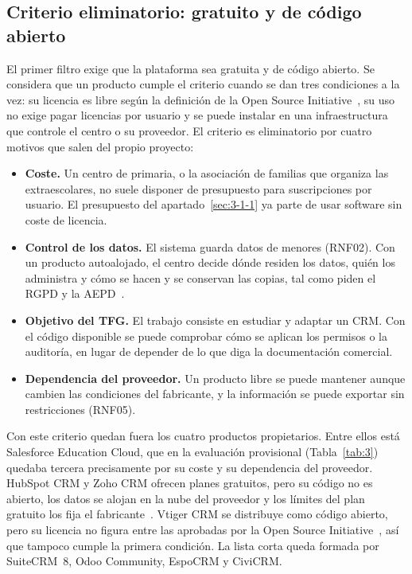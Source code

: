 \subsection{Criterio eliminatorio: gratuito y de código abierto}\label{sec:dis-eliminatorio}

El primer filtro exige que la plataforma sea gratuita y de código abierto. Se considera que un producto cumple el criterio cuando se dan tres condiciones a la vez: su licencia es libre según la definición de la Open Source Initiative~\cite{ref49}, su uso no exige pagar licencias por usuario y se puede instalar en una infraestructura que controle el centro o su proveedor. El criterio es eliminatorio por cuatro motivos que salen del propio proyecto:

\begin{itemize}
  \item \textbf{Coste.} Un centro de primaria, o la asociación de familias que organiza las extraescolares, no suele disponer de presupuesto para suscripciones por usuario. El presupuesto del apartado~\ref{sec:3-1-1} ya parte de usar software sin coste de licencia.
  \item \textbf{Control de los datos.} El sistema guarda datos de menores (RNF02). Con un producto autoalojado, el centro decide dónde residen los datos, quién los administra y cómo se hacen y se conservan las copias, tal como piden el RGPD y la AEPD~\cite{ref02,ref03,ref04}.
  \item \textbf{Objetivo del TFG.} El trabajo consiste en estudiar y adaptar un CRM. Con el código disponible se puede comprobar cómo se aplican los permisos o la auditoría, en lugar de depender de lo que diga la documentación comercial.
  \item \textbf{Dependencia del proveedor.} Un producto libre se puede mantener aunque cambien las condiciones del fabricante, y la información se puede exportar sin restricciones (RNF05).
\end{itemize}

Con este criterio quedan fuera los cuatro productos propietarios. Entre ellos está Salesforce Education Cloud, que en la evaluación provisional (Tabla~\ref{tab:3}) quedaba tercera precisamente por su coste y su dependencia del proveedor. HubSpot CRM y Zoho CRM ofrecen planes gratuitos, pero su código no es abierto, los datos se alojan en la nube del proveedor y los límites del plan gratuito los fija el fabricante~\cite{ref45,ref46}. Vtiger CRM se distribuye como código abierto, pero su licencia no figura entre las aprobadas por la Open Source Initiative~\cite{ref43}, así que tampoco cumple la primera condición. La lista corta queda formada por SuiteCRM~8, Odoo Community, EspoCRM y CiviCRM.

